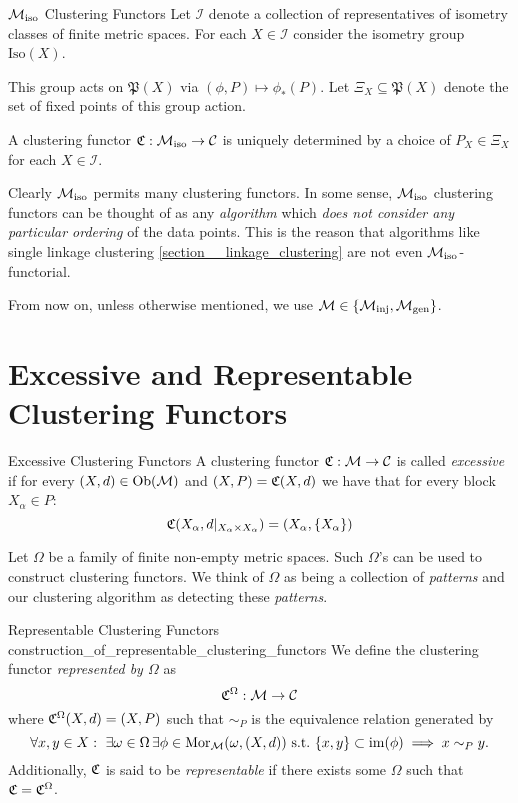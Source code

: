 \begin{myremark}{${\mathcal{M}_\mathrm{iso}}$ Clustering Functors \cite[Thm.~6.1]{Carlsson2010}}{}
Let $\mathcal{I}$ denote a collection of representatives of isometry classes of finite metric spaces.
For each $X \in \mathcal{I}$ consider the isometry group $\mathrm{Iso}(X)$. \par

\medskip This group acts on $\mathfrak{P}(X)$ via $(\phi, P) \mapsto \phi_*(P)$.
Let $\Xi_X \subseteq \mathfrak{P}(X)$ denote the set of fixed points of this group action. \par

\medskip A clustering functor $\mathfrak{C}: {\mathcal{M}_\mathrm{iso}} \to \mathcal{C}$ is uniquely determined by a choice of $P_X \in \Xi_X$ for each $X \in \mathcal{I}$.
\end{myremark}

Clearly ${\mathcal{M}_\mathrm{iso}}$ permits many clustering functors.
In some sense, ${\mathcal{M}_\mathrm{iso}}$ clustering functors can be thought of as any \emph{algorithm} which \emph{does not consider any particular ordering} of the data points.
This is the reason that algorithms like single linkage clustering \ref{section__linkage_clustering} are not even ${\mathcal{M}_\mathrm{iso}}$-functorial.

From now on, unless otherwise mentioned, we use $\mathcal{M} \in \{{\mathcal{M}_\mathrm{inj}}, {\mathcal{M}_\mathrm{gen}}\}$.

\section{Excessive and Representable Clustering Functors}

\begin{definition}{Excessive Clustering Functors \cite[Def.~6.2]{Carlsson2010}}{}
A clustering functor $\mathfrak{C}: \mathcal{M} \to \mathcal{C}$ is called \emph{excessive} if for every $(X,d) \in \mathrm {Ob}(\mathcal{M})$ and $(X,P) = \mathfrak{C}(X,d)$ we have that for every block $X_\alpha \in P$:
$$
\mathfrak{C}(X_\alpha, d|_{X_\alpha \times X_\alpha}) = (X_\alpha, \{X_\alpha\})
$$
\end{definition}

Let $\Omega$ be a family of finite non-empty metric spaces. Such $\Omega$'s can be used to construct clustering functors. We think of $\Omega$ as being a collection of \emph{patterns} and our clustering algorithm as detecting these \emph{patterns}.

\begin{definition}{Representable Clustering Functors \cite[Sec.~6.2]{Carlsson2010}}{construction_of_representable_clustering_functors}
We define the clustering functor \emph{represented by $\Omega$} as
$$
\mathfrak{C}^\Omega: \mathcal{M} \to \mathcal{C}
$$
where $\mathfrak{C}^\Omega(X,d) = (X, P)$ such that $\sim_P$ 
is the equivalence relation generated by
\begin{equation*}
    \forall x,y \in X: \ \exists \omega \in \Omega \,\exists \phi \in \mathrm {Mor}_{\mathcal{M}}(\omega, (X,d)) \ \text{s.t.} \ \{x,y\} \subset \operatorname*{im}(\phi) \implies x \sim_P y.
\end{equation*}
Additionally, $\mathfrak{C}$ is said to be \emph{representable} if there exists some $\Omega$ such that $\mathfrak{C} = \mathfrak{C}^\Omega$.
\end{definition}

